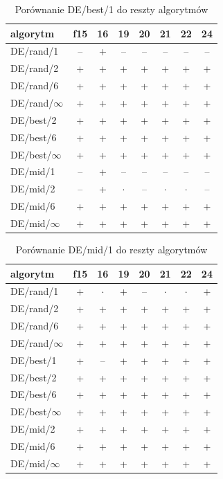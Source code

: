 \documentclass[a4paper,onecolumn,oneside,11pt,wide,floatssmall]{mwrep}
\theoremstyle{definition}
\theoremstyle{plain}%
\theoremstyle{remark}
\begin{document}
\begin{table}[H]
\centering
\begin{tabular}{ l | c | c | c | c | c | c | c }
algorytm         &f15& 16& 19& 20& 21& 22& 24 \\ \hline
DE/rand/1	 & -- & + & -- & -- & -- & -- & -- \\
DE/rand/2	 & + & + & + & + & + & + & + \\
DE/rand/6	 & + & + & + & + & + & + & + \\
DE/rand/$\infty$	 & + & + & + & + & + & + & + \\
DE/best/2	 & + & + & + & + & + & + & + \\
DE/best/6	 & + & + & + & + & + & + & + \\
DE/best/$\infty$	 & + & + & + & + & + & + & + \\
DE/mid/1	 & -- & + & -- & -- & -- & -- & -- \\
DE/mid/2	 & -- & + & $\cdot$ & -- & $\cdot$ & $\cdot$ & -- \\
DE/mid/6	 & + & + & + & + & + & + & + \\
DE/mid/$\infty$	 & + & + & + & + & + & + & + \\
\end{tabular}
\caption{Porównanie DE/best/1 do reszty algorytmów}
\end{table}

\begin{table}[H]
\centering
\begin{tabular}{ l | c | c | c | c | c | c | c }
algorytm         &f15& 16& 19& 20& 21& 22& 24 \\ \hline
DE/rand/1	 & + & $\cdot$ & + & -- & $\cdot$ & $\cdot$ & + \\
DE/rand/2	 & + & + & + & + & + & + & + \\
DE/rand/6	 & + & + & + & + & + & + & + \\
DE/rand/$\infty$	 & + & + & + & + & + & + & + \\
DE/best/1	 & + & -- & + & + & + & + & + \\
DE/best/2	 & + & + & + & + & + & + & + \\
DE/best/6	 & + & + & + & + & + & + & + \\
DE/best/$\infty$	 & + & + & + & + & + & + & + \\
DE/mid/2	 & + & + & + & + & + & + & + \\
DE/mid/6	 & + & + & + & + & + & + & + \\
DE/mid/$\infty$	 & + & + & + & + & + & + & + \\
\end{tabular}
\caption{Porównanie DE/mid/1 do reszty algorytmów}
\end{table}
\end{document}
